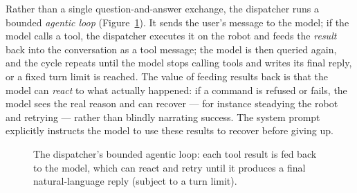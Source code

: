 Rather than a single question-and-answer exchange, the dispatcher runs a
bounded \emph{agentic loop} (Figure~\ref{fig:ailoop}). It sends the user's
message to the model; if the model calls a tool, the dispatcher executes it
on the robot and feeds the \emph{result} back into the conversation as a
tool message; the model is then queried again, and the cycle repeats until
the model stops calling tools and writes its final reply, or a fixed turn
limit is reached. The value of feeding results back is that the model can
\emph{react} to what actually happened: if a command is refused or fails,
the model sees the real reason and can recover --- for instance steadying
the robot and retrying --- rather than blindly narrating success. The
system prompt explicitly instructs the model to use these results to
recover before giving up.

\begin{figure}[ht]
  \centering
  \caption{The dispatcher's bounded agentic loop: each tool result is fed
           back to the model, which can react and retry until it produces a
           final natural-language reply (subject to a turn limit).}
  \label{fig:ailoop}
\end{figure}

